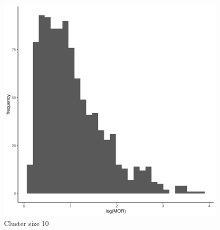\documentclass[
  letterpaper,
  DIV=11,
  numbers=noendperiod,
  titlepage]{scrartcl}
\begin{document}
\begin{figure}
\begin{minipage}[t]{0.24\linewidth}
{{\includegraphics{../../plots/two-lvl-ran-slope/low-prev/hist_10_10_two_lvl_slp_low_prev_q1.png}

}

\caption{Cluster size 10}

}

\end{minipage}%
%
\begin{minipage}[t]{0.24\linewidth}

{\centering 

}
\end{minipage}
\end{figure}
\end{document}
